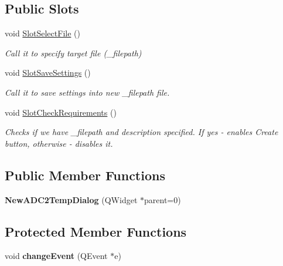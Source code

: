 \subsection*{Public Slots}
\begin{DoxyCompactItemize}
\item 
void \hyperlink{class_new_a_d_c2_temp_dialog_aecb2c340ccb0c4ceb395ba688c092317}{Slot\+Select\+File} ()
\begin{DoxyCompactList}\small\item\em Call it to specify target file (\+\_\+filepath) \end{DoxyCompactList}\item 
void \hyperlink{class_new_a_d_c2_temp_dialog_a59b42efcbe03d9429250558eebaf6dd3}{Slot\+Save\+Settings} ()
\begin{DoxyCompactList}\small\item\em Call it to save settings into new \+\_\+filepath file. \end{DoxyCompactList}\item 
void \hyperlink{class_new_a_d_c2_temp_dialog_afe68e82283f8cf518d6df9fafcea2a43}{Slot\+Check\+Requirements} ()
\begin{DoxyCompactList}\small\item\em Checks if we have \+\_\+filepath and description specified. If yes -\/ enables Create button, otherwise -\/ disables it. \end{DoxyCompactList}\end{DoxyCompactItemize}
\subsection*{Public Member Functions}
\begin{DoxyCompactItemize}
\item 
\mbox{\label{class_new_a_d_c2_temp_dialog_a4c7f66049c9ac670cb577700fde06eac}} 
{\bfseries New\+A\+D\+C2\+Temp\+Dialog} (Q\+Widget $\ast$parent=0)
\end{DoxyCompactItemize}
\subsection*{Protected Member Functions}
\begin{DoxyCompactItemize}
\item 
\mbox{\label{class_new_a_d_c2_temp_dialog_ad134682522a39b4843feae7662574ace}} 
void {\bfseries change\+Event} (Q\+Event $\ast$e)
\end{DoxyCompactItemize}


